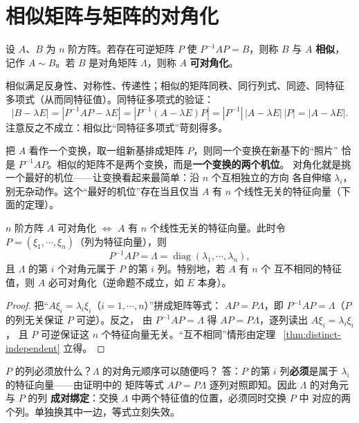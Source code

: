 \section{相似矩阵与矩阵的对角化}\label{sec:similar}

\begin{definition}\label{def:similar}
设 $A$、$B$ 为 $n$ 阶方阵。若存在可逆矩阵 $P$ 使 $P^{-1}AP=B$，则称 $B$ 与
$A$ \textbf{相似}，记作 $A\sim B$。若 $B$ 是对角矩阵 $\Lambda$，则称 $A$
\textbf{可对角化}。
\end{definition}

相似满足反身性、对称性、传递性；相似的矩阵同秩、同行列式、同迹、同特征
多项式（从而同特征值）。同特征多项式的验证：
\[
  |B-\lambda E|=|P^{-1}AP-\lambda E|
  =|P^{-1}(A-\lambda E)P|=|P^{-1}|\,|A-\lambda E|\,|P|=|A-\lambda E|.
\]
注意反之不成立：相似比“同特征多项式”苛刻得多。

\begin{insight}[本质：相似 = 同一个变换在不同基下的两张照片]
把 $A$ 看作一个变换，取一组新基排成矩阵 $P$，则同一个变换在新基下的“照片”
恰是 $P^{-1}AP$。相似的矩阵不是两个变换，而是\textbf{一个变换的两个机位}。
对角化就是挑一个最好的机位——让变换看起来最简单：沿 $n$ 个互相独立的方向
各自伸缩 $\lambda_i$，别无杂动作。这个“最好的机位”存在当且仅当 $A$ 有
$n$ 个线性无关的特征向量（下面的定理）。
\end{insight}

\begin{theorem}\label{thm:diagonalizable}
$n$ 阶方阵 $A$ 可对角化 $\iff$ $A$ 有 $n$ 个线性无关的特征向量。此时令
$P=(\xi_1,\cdots,\xi_n)$（列为特征向量），则
\[
  P^{-1}AP=\Lambda=\operatorname{diag}(\lambda_1,\cdots,\lambda_n),
\]
且 $\Lambda$ 的第 $i$ 个对角元属于 $P$ 的第 $i$ 列。特别地，若 $A$ 有 $n$ 个
互不相同的特征值，则 $A$ 必可对角化（逆命题不成立，如 $E$ 本身）。
\end{theorem}
\begin{proof}
把“$A\xi_i=\lambda_i\xi_i$（$i=1,\cdots,n$）”拼成矩阵等式：
$AP=P\Lambda$，即 $P^{-1}AP=\Lambda$（$P$ 的列无关保证 $P$ 可逆）。反之，
由 $P^{-1}AP=\Lambda$ 得 $AP=P\Lambda$，逐列读出 $A\xi_i=\lambda_i\xi_i$，
且 $P$ 可逆保证这 $n$ 个特征向量无关。“互不相同”情形由定理
~\ref{thm:distinct-independent} 立得。
\end{proof}

\begin{qa}{$P$ 的列必须放什么？$\Lambda$ 的对角元顺序可以随便吗？}
答：$P$ 的第 $i$ 列\textbf{必须}是属于 $\lambda_i$ 的特征向量——由证明中的
矩阵等式 $AP=P\Lambda$ 逐列对照即知。因此 $\Lambda$ 的对角元与 $P$ 的列
\textbf{成对绑定}：交换 $\Lambda$ 中两个特征值的位置，必须同时交换 $P$ 中
对应的两个列。单独换其中一边，等式立刻失效。
\end{qa}

